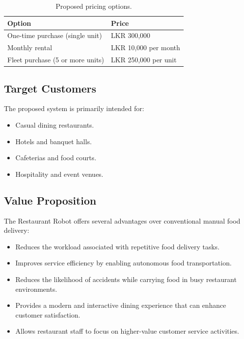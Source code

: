 \documentclass[12pt,a4paper]{article}
\begin{document}
\begin{table}[H]
\centering
\caption{Proposed pricing options.}
\label{tab:pricing-options}
\renewcommand{\arraystretch}{1.2}
\begin{tabular}{@{}p{7cm}p{5cm}@{}}
\toprule
\textbf{Option} & \textbf{Price} \\
\midrule
One-time purchase (single unit) & LKR 300,000 \\
Monthly rental & LKR 10,000 per month \\
Fleet purchase (5 or more units) & LKR 250,000 per unit \\
\bottomrule
\end{tabular}
\end{table}

\subsection{Target Customers}

The proposed system is primarily intended for:

\begin{itemize}[nosep]
    \item Casual dining restaurants.
    \item Hotels and banquet halls.
    \item Cafeterias and food courts.
    \item Hospitality and event venues.
\end{itemize}

\subsection{Value Proposition}

The Restaurant Robot offers several advantages over conventional
manual food delivery:

\begin{itemize}[nosep]
    \item Reduces the workload associated with repetitive food
    delivery tasks.

    \item Improves service efficiency by enabling autonomous food
    transportation.

    \item Reduces the likelihood of accidents while carrying food in
    busy restaurant environments.

    \item Provides a modern and interactive dining experience that can
    enhance customer satisfaction.

    \item Allows restaurant staff to focus on higher-value customer
    service activities.
\end{itemize}
\end{document}
